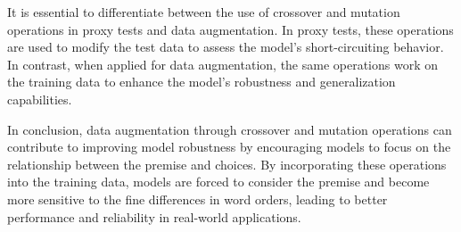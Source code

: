 It is essential to differentiate between the use of crossover and mutation operations in proxy tests and data augmentation. In proxy tests, these operations are used to modify the test data to assess the model's short-circuiting behavior. In contrast, when applied for data augmentation, the same operations work on the training data to enhance the model's robustness and generalization capabilities.

In conclusion, data augmentation through crossover and mutation operations can contribute to improving model robustness by encouraging models to focus on the relationship between the premise and choices. By incorporating these operations into the training data, models are forced to consider the premise and become more sensitive to the fine differences in word orders, leading to better performance and reliability in real-world applications.
